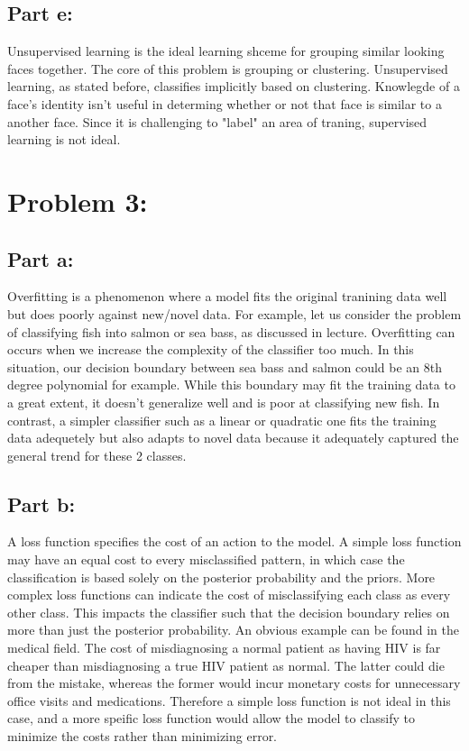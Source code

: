 \documentclass[a4paper,12pt]{article}
\begin{document}
\subsection*{Part e:}
Unsupervised learning is the ideal learning shceme for grouping similar looking faces together. The core of this problem is grouping or clustering. Unsupervised learning, as stated before, classifies implicitly based on clustering. Knowlegde of a face's identity isn't useful in determing whether or not that face is similar to a another face. Since it is challenging to "label" an area of traning, supervised learning is not ideal.

\section*{Problem 3:}
\subsection*{Part a:}
Overfitting is a phenomenon where a model fits the original tranining data well but does poorly against new/novel data. For example, let us consider the problem of classifying fish into salmon or sea bass, as discussed in lecture. Overfitting can occurs when we increase the complexity of the classifier too much. In this situation, our decision boundary between sea bass and salmon could be an 8th degree polynomial for example. While this boundary may fit the training data to a great extent, it doesn't generalize well and is poor at classifying new fish. In contrast, a simpler classifier such as a linear or quadratic one fits the training data adequetely but also adapts to novel data because it adequately captured the general trend for these 2 classes.

\subsection*{Part b:}
A loss function specifies the cost of an action to the model. A simple loss function may have an equal cost to every misclassified pattern, in which case the classification is based solely on the posterior probability and the priors. More complex loss functions can indicate the cost of misclassifying each class as every other class. This impacts the classifier such that the decision boundary relies on more than just the posterior probability. An obvious example can be found in the medical field. The cost of misdiagnosing a normal patient as having HIV is far cheaper than misdiagnosing a true HIV patient as normal. The latter could die from the mistake, whereas the former would incur monetary costs for unnecessary office visits and medications.  Therefore a simple loss function is not ideal in this case, and a more speific loss function would allow the model to classify to minimize the costs rather than minimizing error.
\end{document}
